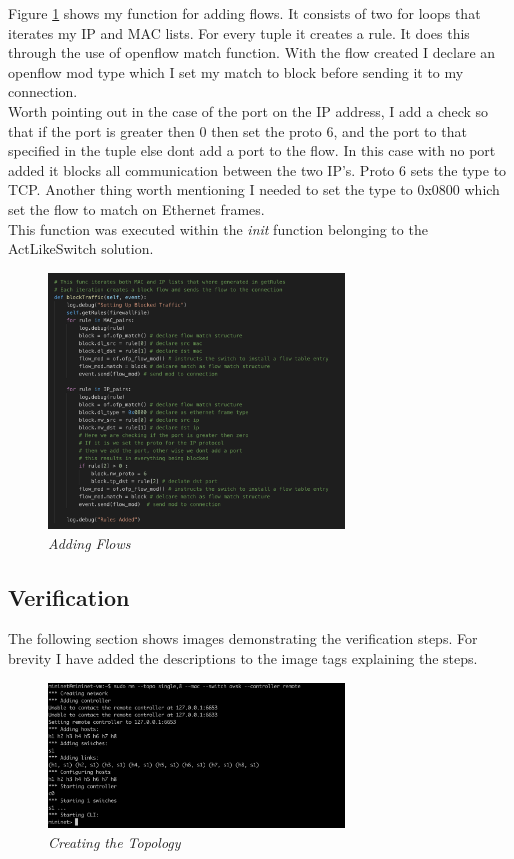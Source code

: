 Figure \ref{img:p3} shows my function for adding flows. It consists of two for loops that iterates my IP and MAC lists. For every tuple it creates a rule. It does this through the use of openflow match function. With the flow created I declare an openflow mod type which I set my match to block before sending it to my connection.
\\Worth pointing out in the case of the port on the IP address, I add a check so that if the port is greater then 0 then set the proto 6, and the port to that specified in the tuple else dont add a port to the flow. In this case with no port added it blocks all communication between the two IP's. Proto 6 sets the type to TCP. Another thing worth mentioning I needed to set the type to 0x0800 which set the flow to match on Ethernet frames.
\\This function was executed within the \textit{init} function belonging to the ActLikeSwitch solution.
\begin{figure}[!ht]
\centering
\includegraphics*[width=0.7\textwidth]{images/p3.png}
\caption{\em Adding Flows}
\label{img:p3}
\end{figure}

\subsection{Verification}
\label{sub:ver}
The following section shows images demonstrating the verification steps. For brevity I have added the descriptions to the image tags explaining the steps.

\begin{figure}[!ht]
\centering
\includegraphics*[width=0.7\textwidth]{images/o1.png}
\caption{\em Creating the Topology}
\label{img:o1}
\end{figure}

